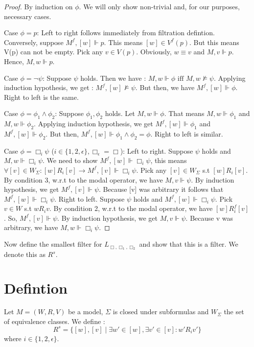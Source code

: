 \documentclass[12pt, a4paper]{scrreprt}
\begin{document}
\begin{proof}
By induction on $\phi$. We will only show non-trivial and, for our purposes, necessary cases. \newline

Case $\phi = p$: Left to right follows immediately from filtration defintion. Conversely, suppose
$M^f, [w] \Vdash p$. This means $ [w] \in V^f(p)$. But this means V(p) can not be empty. Pick any $v\in V(p)$. Obviously, $w\equiv v$ and
$M,v\Vdash p$. Hence, $M,w \Vdash p$. \newline

Case $\phi = \neg \psi$: Suppose $\psi$ holds. Then we have : $M,w \Vdash \phi \mbox{ iff } M,w \nvDash \psi$. Applying 
induction hypothesis, we get : $M^f, [w] \nvDash \psi$. But then, we have $M^f, [w] \Vdash \phi$. Right to left is the same. \newline

Case $\phi = \phi_1 \land \phi_2$: Suppose $\phi_1, \phi_2$ holds. Let $M,w \Vdash \phi$. That means $M,w \Vdash \phi_1$ and $M,w \Vdash \phi_2$. Applying
induction hypothesis, we get $M^f,[w] \Vdash \phi_1$ and $M^f,[w] \Vdash \phi_2$. But then, $M^f,[w] \Vdash \phi_1 \land \phi_2 = \phi$. Right to left is similar. \newline

Case $\phi = \Box_i\psi$ ($i \in \{1,2,\epsilon\}, \Box_\epsilon = \Box$): Left to right. Suppose $\psi$ holds and  $M,w \Vdash \Box_i \psi$. 
We need to show $M^f,[w] \Vdash \Box_i \psi$, this means $\forall [v] \in W_\Sigma : [w]R_i[v] \rightarrow M^f,[v] \Vdash \Box_i \psi$. Pick any $[v] \in W_\Sigma$ s.t 
$[w]R_i[v]$. By condition 3, w.r.t to the modal operator, we have $M,v \Vdash \psi$. By induction hypothesis, we get $M^f,[v] \Vdash \psi$. Because [v] was arbitrary it follows that $M^f,[w] \Vdash \Box_i \psi$. \newline \newline
Right to left. Suppose $\psi$ holds and $M^f,[w] \Vdash \Box_i \psi$. Pick $v \in W$ s.t $wR_iv$. By condition 2, w.r.t to the modal operator, we have
$[w]R^f_i[v]$. So, $M^f, [v] \Vdash \psi$. By induction hypothesis, we get $M,v \Vdash \psi$. Because v was arbitrary, we have $M,w \Vdash \Box_i \psi$.

\end{proof} 

Now define the smallest filter for $L_{\Box,\Box_1,\Box_2}$ and show that this is a filter. We denote this as $R^s$.

\section{Defintion}
 Let $M = (W,R,V)$ be a model, $\Sigma$ is closed under subformulas and $W_\Sigma$ the set of equivalence classes. We define :
$$R^s = \{[w],[v] \mid \exists w' \in [w], \exists v' \in [v] : w'R_i v'\}$$
where $i \in \{1,2,\epsilon\}$.         
\end{document}
